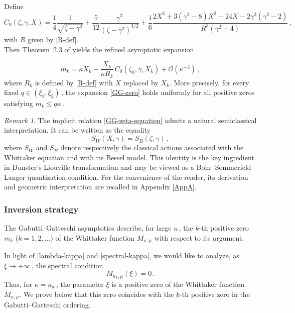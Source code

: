\documentclass[11pt]{amsart}
\numberwithin{equation}{section}
\theoremstyle{remark}
\newtheorem{remark}[theorem]{Remark}
\newcommand{\mn}{\medskip\noindent}
\begin{document}
\mn
Define
\begin{equation}\label{C0-def}
C_0(\zeta,\gamma,X)
=
\frac14\frac1{\sqrt{\zeta-\gamma^2}}
+
\frac5{12}
\frac{\gamma^2}{(\zeta-\gamma^2)^{3/2}}
+
\frac16
\frac{2X^3+3(\gamma^2-8)X^2+24X-2\gamma^2(\gamma^2-2)}
{R^3(\gamma^2-4)}\,,
\end{equation}
with \(R\) given by \eqref{R-def}.\\
Then Theorem~2.3 of \cite{GG2001} yields the refined asymptotic expansion

\begin{equation}\label{GG-zero}
m_k
=
\kappa X_k
-
\frac{X_k}{\kappa R_k}
\,C_0(\zeta_k,\gamma,X_k)
+
\mathcal O(\kappa^{-3})\,,
\end{equation}
where \(R_k\) is defined by \eqref{R-def} with \(X\) replaced by \(X_k\).  More precisely, for every fixed \(q\in(\xi_1,\xi_2)\,\), the expansion
\eqref{GG-zero} holds uniformly for all positive zeros satisfying
\(m_k\le q\kappa\)\,.


\begin{remark}
The implicit relation \eqref{GG-zeta-equation} admits a natural
semiclassical interpretation. It can be written as the equality
\begin{equation}
S_W(X,\gamma)=S_B(\zeta,\gamma)\,,
\end{equation}
where \(S_W\) and \(S_B\) denote respectively the classical actions
associated with the Whittaker equation and with its Bessel model. This identity is the key ingredient in Dunster's Liouville
transformation and may be viewed as a Bohr--Sommerfeld--Langer
quantization condition. For the convenience of the reader, its
derivation and geometric interpretation are recalled in
Appendix \ref{AppA}.
\end{remark}








\subsubsection{Inversion strategy}
 The Gabutti--Gatteschi asymptotics describe, for large \(\kappa\,\), the
\(k\)-th positive zero \(m_k\) (\(k=1,2,\ldots\)) of the Whittaker function
\(M_{\kappa,\mu}\) with respect to its argument.


\mn
In light of \eqref{lambda-kappa} and \eqref{spectral-kappa}, we would like to analyze, as $\xi\to+\infty\,$, the spectral condition
\[
M_{\kappa_k,\mu}(\xi)=0\,.
\]
Thus, for \(\kappa=\kappa_k\)\,, the parameter \(\xi\) is a positive zero
of the Whittaker function \(M_{\kappa,\mu}\). We prove below that this zero coincides with the $k$-th positive zero in the
Gabutti--Gatteschi ordering.
\end{document}
